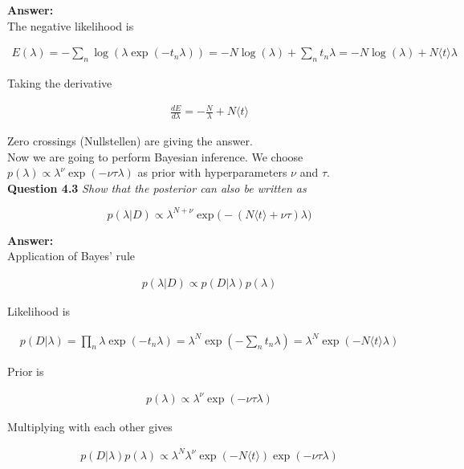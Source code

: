 \documentclass[a4paper]{article}
\begin{document}
\textbf{Answer:}\\

The negative likelihood is 

\begin{align*}
E(\lambda) = - \sum_n \log(\lambda \exp(-t_n \lambda)) = - N \log(\lambda) + \sum_n t_n \lambda = - N \log(\lambda) + N \langle t \rangle \lambda
\end{align*}

Taking the derivative

\begin{align*}
\frac{d E}{d \lambda} = - \frac{N}{\lambda} + N \langle t \rangle
\end{align*}

Zero crossings (Nullstellen) are giving the answer.\\ 

Now we are going to perform Bayesian inference. We choose $p(\lambda) \propto \lambda^\nu \exp(- \nu \tau \lambda)$ as prior with hyperparameters $\nu$ and $\tau$.\\


\textbf{Question 4.3}  \textit{Show that the posterior can also be written as}

\begin{equation}
\label{eq:posterior}
	p(\lambda | D) \propto \lambda^{N + \nu} \exp \big( - (N \langle t \rangle + \nu \tau) \lambda \big)
\end{equation}

\textbf{Answer:}\\

Application of Bayes' rule

\begin{align*}
p(\lambda | D) \propto p(D | \lambda)p(\lambda)
\end{align*}

Likelihood is 

\begin{align*}
p(D | \lambda) = \prod_n \lambda \exp(-t_n \lambda) = \lambda^N \exp(- \sum_n t_n \lambda) = \lambda^N \exp(-N \langle t \rangle \lambda)
\end{align*}

Prior is 

\begin{align*}
p(\lambda) \propto \lambda^\nu \exp(- \nu \tau \lambda)
\end{align*}

Multiplying with each other gives

\begin{align*}
p(D | \lambda)p(\lambda) \propto \lambda^N \lambda^\nu \exp(- N \langle t \rangle) \exp(- \nu \tau \lambda)
\end{align*}
\end{document}

